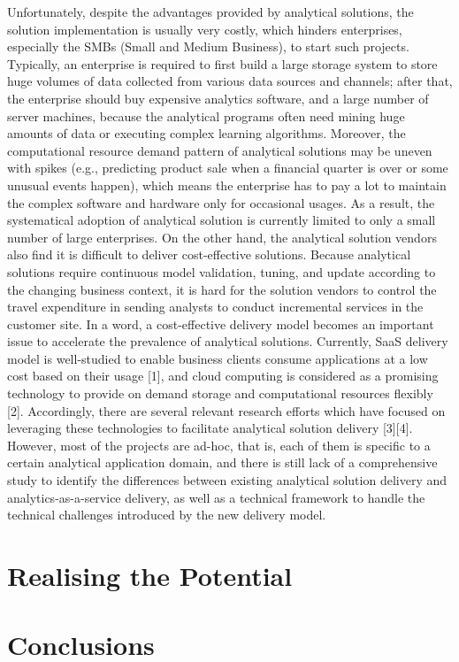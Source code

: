 \documentclass{llncs}
\begin{document}
Unfortunately, despite the advantages provided by analytical solutions, the solution implementation is usually very costly, which hinders enterprises, especially the SMBs (Small and Medium Business), to start such projects. Typically, an enterprise is required to first build a large
storage system to store huge volumes of data collected from various data sources and channels; after that, the enterprise should buy expensive analytics software, and a large number of server machines, because the analytical programs often need mining huge amounts of data or executing complex learning algorithms. Moreover, the computational resource demand pattern of analytical solutions may be uneven with spikes (e.g., predicting product sale when a financial quarter is over or some unusual events happen), which means the enterprise has to pay a lot to maintain the complex software and hardware only for occasional usages. As a result, the systematical adoption of analytical
solution is currently
limited to only a small number of large enterprises. On the other hand, the analytical solution vendors also
find it is difficult to deliver cost-effective solutions. Because analytical solutions
require continuous model validation,
tuning, and update according to the changing business context,
it is hard for the solution vendors to control
the
travel expenditure in sending analysts to conduct incremental services in the customer site. In a word, a cost-effective delivery model becomes an
important
issue to accelerate the prevalence of analytical
solutions. Currently, SaaS delivery model is well-studied to enable business clients consume applications at a low cost based on their usage [1], and cloud computing is considered as a promising technology to provide on demand storage and computational resources flexibly [2]. Accordingly, there are several
relevant research efforts which have focused on
leveraging these technologies to facilitate analytical solution delivery [3][4]. However, most of the projects are ad-hoc, that is, each of them is
specific to a certain analytical
application domain, and there is still lack of a comprehensive study to identify the differences between existing analytical solution delivery and analytics-as-a-service delivery, as well as a technical framework to handle the technical challenges introduced by the new delivery model.


\section{Realising the Potential}
	
\section{Conclusions}





%
%
%
\end{document}
